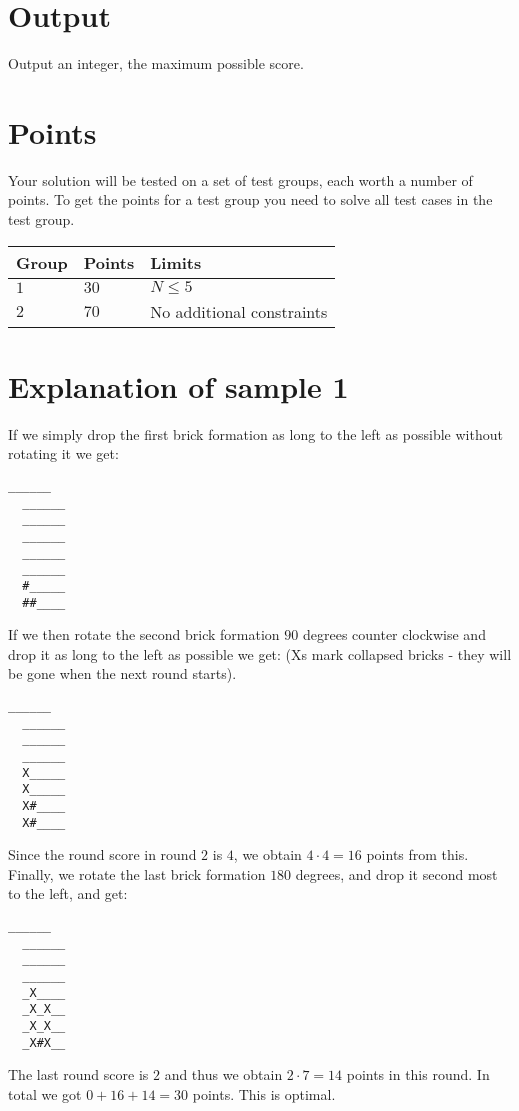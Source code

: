 \section*{Output}
\noindent
Output an integer, the maximum possible score.

\section*{Points}
\noindent
Your solution will be tested on a set of test groups, each worth a number of points.
To get the points for a test group you need to solve all test cases in the test group.

\noindent
\begin{tabular}{| l | l | p{12cm} |}
  \hline
  Group & Points & Limits \\ \hline
  $1$    & $30$       &  $N \leq 5$  \\ \hline 
  $2$    & $70$       &  No additional constraints \\ \hline
\end{tabular}

\section*{Explanation of sample 1}
\noindent
If we simply drop the first brick formation as long to the left as possible without rotating it we
get:

\noindent
\begin{lstlisting}[basicstyle=\ttfamily]
  ______
  ______
  ______
  ______
  ______
  ______
  #_____
  ##____
\end{lstlisting}

If we then rotate the second brick formation $90$ degrees counter clockwise and drop it as
long to the left as possible we get: (Xs mark collapsed bricks - they will be gone when the
next round starts).

\noindent
\begin{lstlisting}[basicstyle=\ttfamily]
  ______
  ______
  ______
  ______
  X_____
  X_____
  X#____
  X#____
\end{lstlisting}

Since the round score in round $2$ is $4$, we obtain $4 \cdot 4 = 16$ points from this. Finally, we rotate
the last brick formation $180$ degrees, and drop it second most to the left, and get:

\noindent
\begin{lstlisting}[basicstyle=\ttfamily]
  ______
  ______
  ______
  ______
  _X____
  _X_X__
  _X_X__
  _X#X__
\end{lstlisting}

The last round score is $2$ and thus we obtain $2 \cdot 7 = 14$ points in this round. In total we got
$0 + 16 + 14 = 30$ points. This is optimal.